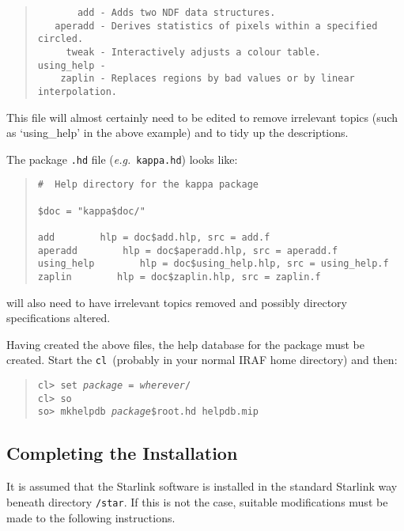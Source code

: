\documentclass[twoside,11pt]{article}
\newcommand{\xlabel}[1]{}
\newcommand{\cl}{\texttt{cl}}
\begin{document}
\begin{quote} \begin{verbatim}
       add - Adds two NDF data structures.
   aperadd - Derives statistics of pixels within a specified circled.
     tweak - Interactively adjusts a colour table.
using_help -
    zaplin - Replaces regions by bad values or by linear interpolation.
\end{verbatim} \end{quote}
This file will almost certainly need to be edited to remove irrelevant
topics (such as `using\_help' in the above example) and to tidy up the
descriptions.

The package \texttt{.hd} file (\textit{e.g.}\ \texttt{kappa.hd}) looks like:
\begin{quote} \begin{verbatim}
#  Help directory for the kappa package

$doc = "kappa$doc/"

add        hlp = doc$add.hlp, src = add.f
aperadd        hlp = doc$aperadd.hlp, src = aperadd.f
using_help        hlp = doc$using_help.hlp, src = using_help.f
zaplin        hlp = doc$zaplin.hlp, src = zaplin.f
\end{verbatim} \end{quote}
will also need to have irrelevant topics removed and possibly directory
specifications altered.

Having created the above files, the help database for the package must be
created. Start the \cl\ (probably in your normal IRAF home directory) and then:

\begin{quote}
\texttt{cl> set \textit{package} = \textit{wherever}/\\
cl> so\\
so> mkhelpdb \textit{package}\$root.hd helpdb.mip}
\end{quote}

\subsection{\xlabel{completing_the_installation}Completing the Installation}

It is assumed that the Starlink software is installed in the standard Starlink
way beneath directory \texttt{/star}. If this is not the case, suitable
modifications must be made to the following instructions.
\end{document}
